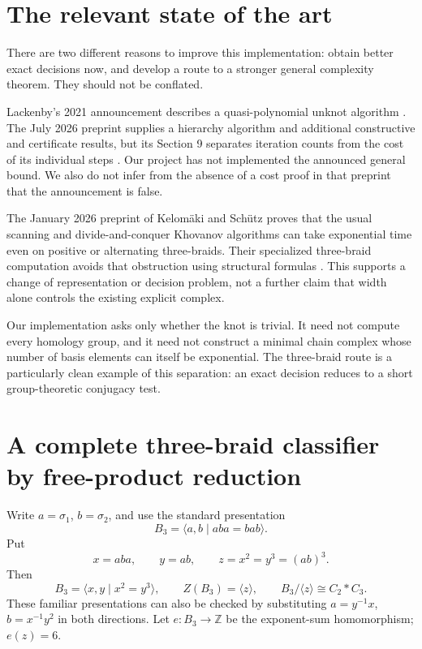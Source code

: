 \documentclass[11pt,letterpaper]{article}
\theoremstyle{definition}
\newcommand{\Z}{\mathbb Z}
\begin{document}
\section{The relevant state of the art}
\label{sec:literature}

There are two different reasons to improve this implementation: obtain
better exact decisions now, and develop a route to a stronger general
complexity theorem. They should not be conflated.

Lackenby's 2021 announcement describes a quasi-polynomial unknot
algorithm \cite{lackenbytalk}. The July 2026 preprint supplies a hierarchy
algorithm and additional constructive and certificate results, but its
Section 9 separates iteration counts from the cost of its individual
steps \cite{lackenby2026}. Our project has not implemented the announced
general bound. We also do not infer from the absence of a cost proof in
that preprint that the announcement is false.

The January 2026 preprint of Kelom\"aki and Sch\"utz proves that the
usual scanning and divide-and-conquer Khovanov algorithms can take
exponential time even on positive or alternating three-braids. Their
specialized three-braid computation avoids that obstruction using
structural formulas \cite{kelomaki2026}. This supports a change of
representation or decision problem, not a further claim that width alone
controls the existing explicit complex.

Our implementation asks only whether the knot is trivial. It need not
compute every homology group, and it need not construct a minimal chain
complex whose number of basis elements can itself be exponential.
The three-braid route is a particularly clean example of this separation:
an exact decision reduces to a short group-theoretic conjugacy test.

\section{A complete three-braid classifier by free-product reduction}
\label{sec:three}

Write \(a=\sigma_1\), \(b=\sigma_2\), and use the standard presentation
\[
 B_3=\langle a,b\mid aba=bab\rangle.
\]
Put
\[
 x=aba,\qquad y=ab,\qquad z=x^2=y^3=(ab)^3.
\]
Then
\[
 B_3=\langle x,y\mid x^2=y^3\rangle,\qquad
 Z(B_3)=\langle z\rangle,\qquad
 B_3/\langle z\rangle\cong C_2*C_3.
\]
These familiar presentations can also be checked by substituting
\(a=y^{-1}x\), \(b=x^{-1}y^2\) in both directions.
Let \(e:B_3\to\Z\) be the exponent-sum homomorphism; \(e(z)=6\).
\end{document}
